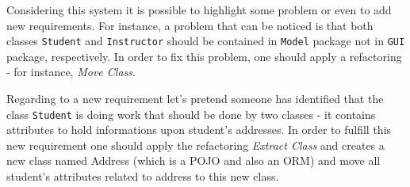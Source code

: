 





Considering this system it is possible to highlight some problem or even to add new requirements. For instance, a problem that can be noticed is that both classes \texttt{Student} and \texttt{Instructor} should be contained in \texttt{Model} package not in \texttt{GUI} package, respectively. In order to fix this problem, one should apply a refactoring - for instance, \textit{Move Class}.
%

%

Regarding to a new requirement let's pretend someone has identified that the class \texttt{Student} is doing work that should be done by two classes - it contains attributes to hold informations upon student's addresses. In order to fulfill this new requirement one should apply the refactoring \textit{Extract Class} and creates a new class named Address (which is a POJO and also an ORM) and move all student's attributes related to address to this new class.


